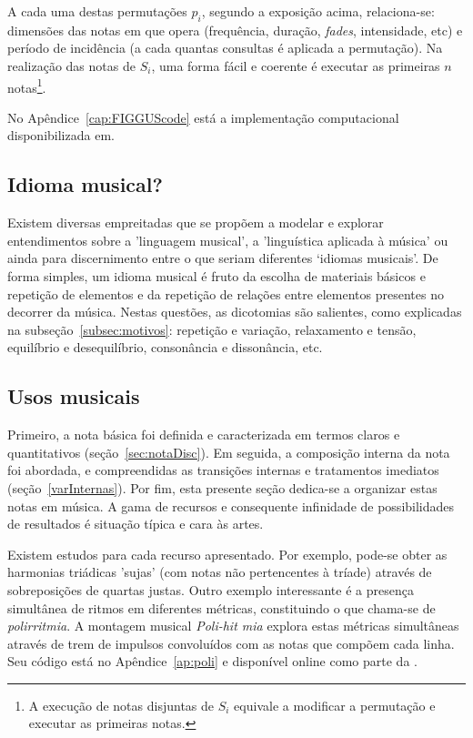 A cada uma destas permutações
$p_i$, segundo a exposição acima, relaciona-se: dimensões das notas em que opera (frequência, duração, \emph{fades}, intensidade, etc) e período de incidência (a cada quantas consultas é aplicada a permutação). Na realização das notas de $S_i$, uma forma fácil e coerente é executar as primeiras $n$ notas\footnote{A execução de notas disjuntas de $S_i$ equivale a modificar a permutação e executar as primeiras notas.}.

No Apêndice~\ref{cap:FIGGUScode} está a implementação computacional disponibilizada em.\cite{MASSA,figgusOriginal,figgusEspacializacao}

\subsection{Idioma musical?}

Existem diversas empreitadas que se propõem a modelar e explorar entendimentos
sobre a 'linguagem musical', a 'linguística aplicada à música' ou ainda
para discernimento entre 
o que seriam diferentes
`idiomas musicais'.\cite{Lerdahl, Harmonia, Salzer,Alfaix}
De forma simples, um idioma musical é fruto da escolha de materiais básicos e
repetição de elementos e da repetição de relações entre elementos presentes no decorrer da música. Nestas questões, as dicotomias são salientes,
como explicadas na subseção~\ref{subsec:motivos}: repetição e variação, relaxamento e tensão, equilíbrio e desequilíbrio, consonância e dissonância, etc. 

\subsection{Usos musicais}\label{subsec:usosmusicais3}

Primeiro, a nota básica foi definida e caracterizada em termos
claros e quantitativos (seção~\ref{sec:notaDisc}). Em seguida, a composição interna da nota foi abordada, e compreendidas as transições internas e tratamentos imediatos (seção~\ref{varInternas}). Por fim, esta presente seção dedica-se a organizar estas notas em música.
A gama de recursos e consequente infinidade de possibilidades de resultados
é situação típica e cara às artes.\cite{Harmonia,Webern}

Existem estudos para cada recurso apresentado. Por exemplo, pode-se obter as harmonias triádicas 'sujas' (com notas não pertencentes à tríade) através de sobreposições de quartas justas. Outro exemplo interessante é a presença simultânea de ritmos em diferentes métricas, constituindo o que chama-se de \emph{polirritmia}. A montagem musical \emph{Poli-hit mia} explora estas métricas simultâneas através de trem de impulsos convoluídos com as notas que compõem cada linha. Seu código está no Apêndice~\ref{ap:poli} e disponível online como parte da \massa.

